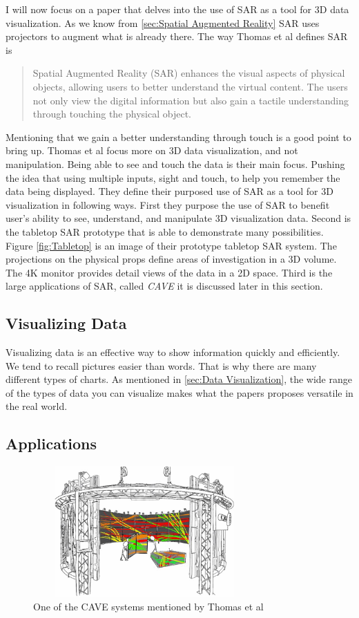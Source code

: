 \documentclass{sig-alternate}
\begin{document}
I will now focus on a paper that delves into the use of SAR as a tool for 3D data visualization. As we know from \ref{sec:Spatial Augmented Reality} SAR uses projectors to augment what is already there. The way Thomas et al \cite{3D} defines SAR is 
\begin{quote}
Spatial Augmented Reality (SAR) enhances the visual aspects of physical objects, allowing users to better understand the virtual content. The users not only view the digital information but also gain a tactile understanding through touching the physical object.
\end{quote}

Mentioning that we gain a better understanding through touch is a good point to bring up.
Thomas et al \cite{3D} focus more on 3D data visualization, and not manipulation. Being able to see and touch the data is their main focus. Pushing the idea that using multiple inputs, sight and touch, to help you remember the data being displayed. They \cite{3D} define their purposed use of SAR as a tool for 3D visualization in following ways. First they purpose the use of SAR to benefit user's ability to see, understand, and manipulate 3D visualization data. Second is the tabletop SAR prototype that is able to demonstrate many possibilities. Figure \ref{fig:Tabletop}  is an image of their prototype tabletop SAR system. The projections on the physical props define areas of investigation in a 3D volume. The 4K monitor provides detail views of the data in a 2D space. Third is the large applications of SAR, called \textit{CAVE} it is discussed later in this section.


\subsection{Visualizing Data}
\label{sec:Visualizing Data}

Visualizing data is an effective way to show information quickly and efficiently. We tend to recall pictures easier than words. That is why there are many different types of charts. As mentioned in \ref{sec:Data Visualization}, the wide range of the types of data you can visualize makes what the papers proposes versatile in the real world.      

\subsection{Applications}
\label{sec:Applications}

\begin{figure}
	\includegraphics[width=8.5cm, height=5cm]{Cave}
	\caption{One of the CAVE systems mentioned by Thomas et al \cite{3D}}
	\label{fig:Cave}
\end{figure}
\end{document}
